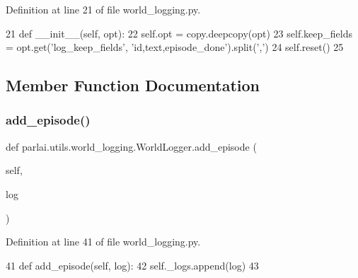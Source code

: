 Definition at line 21 of file world\+\_\+logging.\+py.


\begin{DoxyCode}
21     \textcolor{keyword}{def }\_\_init\_\_(self, opt):
22         self.opt = copy.deepcopy(opt)
23         self.keep\_fields = opt.get(\textcolor{stringliteral}{'log\_keep\_fields'}, \textcolor{stringliteral}{'id,text,episode\_done'}).split(\textcolor{stringliteral}{','})
24         self.reset()
25 
\end{DoxyCode}


\subsection{Member Function Documentation}
\mbox{\label{classparlai_1_1utils_1_1world__logging_1_1WorldLogger_a457d1512dcc0920eb2e745506783c8b0}} 
\subsubsection{\texorpdfstring{add\+\_\+episode()}{add\_episode()}}
{\footnotesize\ttfamily def parlai.\+utils.\+world\+\_\+logging.\+World\+Logger.\+add\+\_\+episode (\begin{DoxyParamCaption}\item[{}]{self,  }\item[{}]{log }\end{DoxyParamCaption})}



Definition at line 41 of file world\+\_\+logging.\+py.


\begin{DoxyCode}
41     \textcolor{keyword}{def }add\_episode(self, log):
42         self.\_logs.append(log)
43 
\end{DoxyCode}
\mbox{\label{classparlai_1_1utils_1_1world__logging_1_1WorldLogger_a42938edb3589e1f3a5754cc200e85f64}} 
